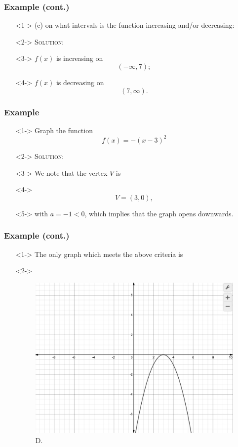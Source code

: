 \documentclass[handout]{beamer}
\begin{document}
\begin{frame}
	\frametitle{Example (cont.)} 
	\begin{enumerate}
		\item[]<1-> (c) on what intervals is the function increasing and/or decreasing: 
		\item[]<2-> \textsc{Solution:} 
		\item[]<3-> $f(x)$ is increasing on \[ \left( -\infty, 7\right);  \]
		\item[]<4-> $f(x)$ is decreasing on 
		\[
			(7, \infty).  
		\]
	\end{enumerate}
\end{frame}

\begin{frame}
	\frametitle{Example} 
	\begin{enumerate}
		\item[]<1-> Graph the function 
		\[
			f(x)=-(x-3)^{2} 
		\]
		\item[]<2-> \textsc{Solution:} 
		\item[]<3-> We note that the vertex $V$ is 
		\item[]<4-> \[ V=(3,0), \] 
		\item[]<5-> with $a=-1<0$, which implies that the graph opens downwards.  
	\end{enumerate}
\end{frame} 

\begin{frame}
	\frametitle{Example (cont.)} 
	\begin{enumerate} 
		\item[]<1-> The only graph which meets the above criteria is 
		\item[]<2-> 
		\begin{figure} 
			\begin{center}
				\caption{D.}
				\includegraphics[scale=0.2]{3_3_8.png} 	 	
			\end{center} 
		\end{figure} 
	\end{enumerate}
\end{frame}
\end{document}
